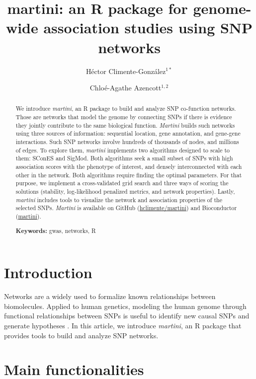 \documentclass[a4paper]{article}
\title{martini: an R package for genome-wide association studies using SNP networks}
\author{Héctor Climente-González$^{1*}$ \and Chloé-Agathe Azencott$^{1,2}$}
\date{
\raggedright{
\small{
    $^1$RIKEN AIP \\
    $^2$MINES ParisTech, PSL Research University, CBIO-Centre for Computational Biology, F-75006 Paris, France;\\
    $^3$ Institut Curie, PSL Research University, F-75005 Paris, France;\\
    $^4$ INSERM, U900, F-75005 Paris, France;\\
}
$^*$Corresponding author: \href{hector.climente@riken.jp}{hector.climente@riken.jp}\\
}
}
\begin{document}
    \maketitle
    
    \begin{abstract}
        
        We introduce \emph{martini}, an R package to build and analyze SNP co-function networks. Those are networks that model the genome by connecting SNPs if there is evidence they jointly contribute to the same biological function. \emph{Martini} builds such networks using three sources of information: sequential location, gene annotation, and gene-gene interactions. Such SNP networks involve hundreds of thousands of nodes, and millions of edges. To explore them, \emph{martini} implements two algorithms designed to scale to them: SConES and SigMod. Both algorithms seek a small subset of SNPs with high association scores with the phenotype of interest, and densely interconnected with each other in the network. Both algorithms require finding the optimal parameters. For that purpose, we implement a cross-validated grid search and three ways of scoring the solutions (stability, log-likelihood penalized metrics, and network properties). Lastly, \emph{martini} includes tools to visualize the network and association properties of the selected SNPs. \emph{Martini} is available on GitHub (\href{https://github.com/hclimente/martini}{hclimente/martini}) and Bioconductor (\href{https://www.bioconductor.org/packages/release/bioc/html/martini.html}{martini}).
        
        \noindent\textbf{Keywords:} gwas, networks, R 
    \end{abstract}

    \tableofcontents
    
    \section{Introduction}
    
    Networks are a widely used to formalize known relationships between biomolecules. Applied to human genetics, modeling the human genome through functional relationships between SNPs is useful to identify new causal SNPs and generate hypotheses \cite{climente-gonzalezBiologicalNetworksGWAS2020}. In this article, we introduce \emph{martini}, an R package that provides tools to build and analyze SNP networks.
    
    \section{Main functionalities}
    
\end{document}
